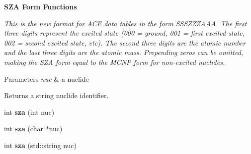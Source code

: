 \begin{Indent}{\bf S\+Z\+A Form Functions}\par
{\em This is the new format for A\+C\+E data tables in the form S\+S\+S\+Z\+Z\+Z\+A\+A\+A. The first three digits represent the excited state (000 = ground, 001 = first excited state, 002 = second excited state, etc). The second three digits are the atomic number and the last three digits are the atomic mass. Prepending zeros can be omitted, making the S\+Z\+A form equal to the M\+C\+N\+P form for non-\/excited nuclides. 
\begin{DoxyParams}{Parameters}
{\em nuc} & a nuclide \\
\hline
\end{DoxyParams}
\begin{DoxyReturn}{Returns}
a string nuclide identifier. 
\end{DoxyReturn}
}\begin{DoxyCompactItemize}
\item 
\hypertarget{namespacepyne_1_1nucname_a4e8f78a4dca435b5b7098a34fe20a76b}{int {\bfseries sza} (int nuc)}\label{namespacepyne_1_1nucname_a4e8f78a4dca435b5b7098a34fe20a76b}

\item 
\hypertarget{namespacepyne_1_1nucname_a8dceb666801fec667177459892e16fb3}{int {\bfseries sza} (char $\ast$nuc)}\label{namespacepyne_1_1nucname_a8dceb666801fec667177459892e16fb3}

\item 
\hypertarget{namespacepyne_1_1nucname_a94c67c8e183760971dfa262057a0deb4}{int {\bfseries sza} (std\+::string nuc)}\label{namespacepyne_1_1nucname_a94c67c8e183760971dfa262057a0deb4}

\end{DoxyCompactItemize}
\end{Indent}
